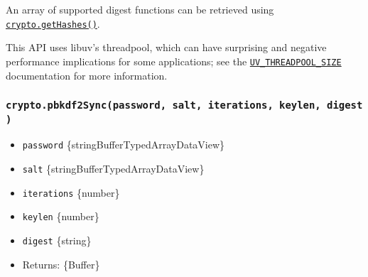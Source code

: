 \begin{Shaded}
\begin{Highlighting}[]
\NormalTok{ \{}
\OperatorTok{,}
\NormalTok{\} }\OperatorTok{=} \NormalTok{(}\NormalTok{)}\OperatorTok{;}

\NormalTok{(}\OperatorTok{,} \OperatorTok{,} \OperatorTok{,} \OperatorTok{,} \OperatorTok{,}\OperatorTok{,}\KeywordTok{=\textgreater{}}\NormalTok{ \{}
  \OperatorTok{;}
  \NormalTok{(}\NormalTok{))}\OperatorTok{;}  
\NormalTok{\})}\OperatorTok{;}
\end{Highlighting}
\end{Shaded}

An array of supported digest functions can be retrieved using
\hyperref[cryptogethashes]{\texttt{crypto.getHashes()}}.

This API uses libuv's threadpool, which can have surprising and negative
performance implications for some applications; see the
\href{cli.md\#uv_threadpool_sizesize}{\texttt{UV\_THREADPOOL\_SIZE}}
documentation for more information.

\subsubsection{\texorpdfstring{\texttt{crypto.pbkdf2Sync(password,\ salt,\ iterations,\ keylen,\ digest)}}{crypto.pbkdf2Sync(password, salt, iterations, keylen, digest)}}\label{crypto.pbkdf2syncpassword-salt-iterations-keylen-digest}

\begin{itemize}
\tightlist
\item
  \texttt{password}
  \{string\textbar Buffer\textbar TypedArray\textbar DataView\}
\item
  \texttt{salt}
  \{string\textbar Buffer\textbar TypedArray\textbar DataView\}
\item
  \texttt{iterations} \{number\}
\item
  \texttt{keylen} \{number\}
\item
  \texttt{digest} \{string\}
\item
  Returns: \{Buffer\}
\end{itemize}

